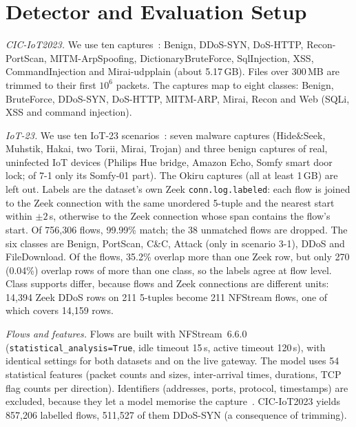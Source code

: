 \section{Detector and Evaluation Setup}\label{sec:setup}

\emph{CIC-IoT2023.} We use ten captures~\cite{neto2023ciciot2023}: Benign, DDoS-SYN, DoS-HTTP, Recon-PortScan, MITM-ArpSpoofing, DictionaryBruteForce, SqlInjection, XSS, CommandInjection and Mirai-udpplain (about 5.17\,GB). Files over 300\,MB are trimmed to their first $10^6$ packets. The captures map to eight classes: Benign, BruteForce, DDoS-SYN, DoS-HTTP, MITM-ARP, Mirai, Recon and Web (SQLi, XSS and command injection).

\emph{IoT-23.} We use ten IoT-23 scenarios~\cite{garcia2020iot23}: seven malware captures (Hide\&Seek, Muhstik, Hakai, two Torii, Mirai, Trojan) and three benign captures of real, uninfected IoT devices (Philips Hue bridge, Amazon Echo, Somfy smart door lock; of 7-1 only its Somfy-01 part). The Okiru captures (all at least 1\,GB) are left out. Labels are the dataset's own Zeek \texttt{conn.log.labeled}: each flow is joined to the Zeek connection with the same unordered 5-tuple and the nearest start within $\pm2$\,s, otherwise to the Zeek connection whose span contains the flow's start. Of 756,306 flows, 99.99\% match; the 38 unmatched flows are dropped. The six classes are Benign, PortScan, C\&C, Attack (only in scenario 3-1), DDoS and FileDownload. Of the flows, 35.2\% overlap more than one Zeek row, but only 270 (0.04\%) overlap rows of more than one class, so the labels agree at flow level. Class supports differ, because flows and Zeek connections are different units: 14,394 Zeek DDoS rows on 211 5-tuples become 211 NFStream flows, one of which covers 14,159 rows.

\emph{Flows and features.} Flows are built with NFStream~6.6.0~\cite{aouini2022nfstream} (\texttt{statistical\_analysis=True}, idle timeout 15\,s, active timeout 120\,s), with identical settings for both datasets and on the live gateway. The model uses 54 statistical features (packet counts and sizes, inter-arrival times, durations, TCP flag counts per direction). Identifiers (addresses, ports, protocol, timestamps) are excluded, because they let a model memorise the capture~\cite{arp2022dos}. CIC-IoT2023 yields 857,206 labelled flows, 511,527 of them DDoS-SYN (a consequence of trimming).

